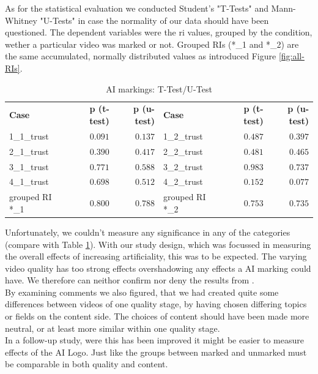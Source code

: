 \documentclass[
  a4paper,  %
  twoside,  %
  bibliography=totoc,
  headsepline,
  cleardoublepage=empty,
  parskip=half,
  draft=false
]{scrbook}
\begin{document}
As for the statistical evaluation we conducted Student's "T-Tests" and Mann-Whitney "U-Tests" in case the normality of our data should have been questioned. The dependent variables were the \gls{ri} values, grouped by the condition, wether a particular video was marked or not. Grouped RIs (*\_1 and *\_2) are the same accumulated, normally distributed values as introduced Figure \ref{fig:all-RIs}.
\begin{table}[h]
	\centering
	\caption{AI markings: T-Test/U-Test}
	\label{tab:ttest_logo-trust}
	{
		\begin{tabular}{lrr|lrr}
			\toprule
			\textbf{Case} & \textbf{p (t-test)} & \textbf{p (u-test)} & \textbf{Case} & \textbf{p (t-test)} & \textbf{p (u-test)}  \\
			\cmidrule[0.4pt]{1-6}
			1\_1\_trust & $0.091$ & $0.137$ & 1\_2\_trust & $0.487$ & $0.397$ \\
			2\_1\_trust & $0.390$ & $0.417$ & 2\_2\_trust & $0.481$ & $0.465$ \\
			3\_1\_trust & $0.771$ & $0.588$ & 3\_2\_trust & $0.983$ & $0.737$ \\
			4\_1\_trust & $0.698$ & $0.512$ & 4\_2\_trust & $0.152$ & $0.077$ \\
			grouped RI *\_1 & $0.800$ & $0.788$ & grouped RI *\_2 & $0.753$ & $0.735$\\
			\bottomrule
		\end{tabular}
	}
\end{table}
Unfortunately, we couldn't measure any significance in any of the categories (compare with Table \ref{tab:ttest_logo-trust}). With our study design, which was focussed in measuring the overall effects of increasing artificiality, this was to be expected. The varying video quality has too strong effects overshadowing any effects a AI marking could have. We therefore can neithor confirm nor deny the results from .\\
By examining comments we also figured, that we had created quite some differences between videos of one quality stage, by having chosen differing topics or fields on the content side. The choices of content should have been made more neutral, or at least more similar within one quality stage. \\
 In a follow-up study, were this has been improved it might be easier to measure effects of the AI Logo. Just like  the groups between marked and unmarked must be comparable in both quality and content.
\end{document}
